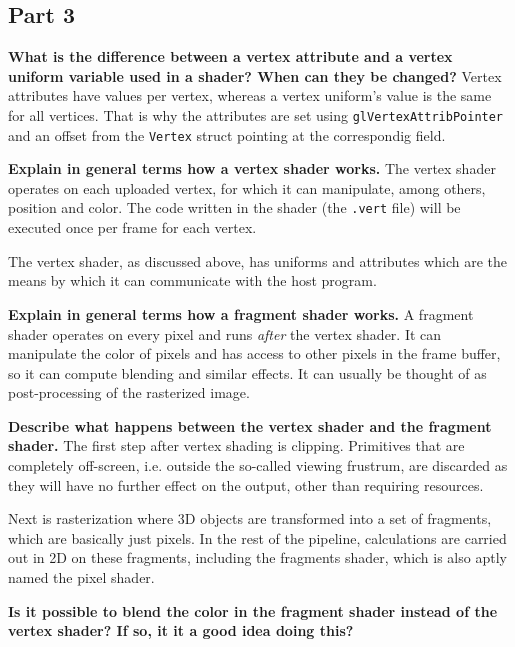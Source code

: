 
\subsection{Part 3}
\textbf{What is the difference between a vertex attribute and a vertex uniform variable used in a shader? When can they be changed?}
Vertex attributes have values per vertex, whereas a vertex uniform's value is the same for all vertices. That is why the attributes are set using \texttt{glVertexAttribPointer} and an offset from the \texttt{Vertex} struct pointing at the correspondig field.

\textbf{Explain in general terms how a vertex shader works.}
The vertex shader operates on each uploaded vertex, for which it can manipulate, among others, position and color. The code written in the shader (the \texttt{.vert} file) will be executed once per frame for each vertex.

The vertex shader, as discussed above, has uniforms and attributes which are the means by which it can communicate with the host program.

\textbf{Explain in general terms how a fragment shader works.}
A fragment shader operates on every pixel and runs \textit{after} the vertex shader. It can manipulate the color of pixels and has access to other pixels in the frame buffer, so it can compute blending and similar effects. It can usually be thought of as post-processing of the rasterized image.

\textbf{Describe what happens between the vertex shader and the fragment shader.}
The first step after vertex shading is clipping. Primitives that are completely off-screen, i.e. outside the so-called viewing frustrum, are discarded as they will have no further effect on the output, other than requiring resources.

Next is rasterization where 3D objects are transformed into a set of fragments, which are basically just pixels. In the rest of the pipeline, calculations are carried out in 2D on these fragments, including the fragments shader, which is also aptly named the pixel shader.

\textbf{Is it possible to blend the color in the fragment shader instead of the vertex shader? If so, it it a good idea doing this?}

